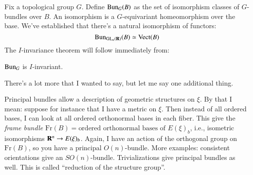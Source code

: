 Fix a topological group $G$. Define $\mathrm{Bun}_G(B)$ as the set of isomorphism classes of $G$-bundles over $B$. An isomorphism is a $G$-equivariant homeomorphism over the base.
We've established that there's a natural isomorphism of functors:
$$\mathrm{Bun}_{\mathrm{GL}_n(\mathbf R)}(B) \simeq \operatorname{Vect}(B)$$
The $I$-invariance theorem will follow immediately from:
\begin{theorem}
    $\mathrm{Bun}_G$ is $I$-invariant.
\end{theorem}
There's a lot more that I wanted to say, but let me say one additional thing.

Principal bundles allow a description of geometric structures on $\xi$. By that I mean: suppose for instance that I have a metric on $\xi$. Then instead of all ordered bases, I can look at all ordered orthonormal bases in each fiber. This give the \emph{frame bundle} $\mathrm{Fr}(B) = \text{ordered orthonormal bases of }E(\xi)_b$, i.e., isometric isomorphisms $\mathbf R^n\to E(\xi)_b$. Again, I have an action of the orthogonal group on $\mathrm{Fr}(B)$, so you have a principal $O(n)$-bundle. More examples: consistent orientations give an $SO(n)$-bundle. Trivializations give principal bundles as well. This is called ``reduction of the structure group''.
